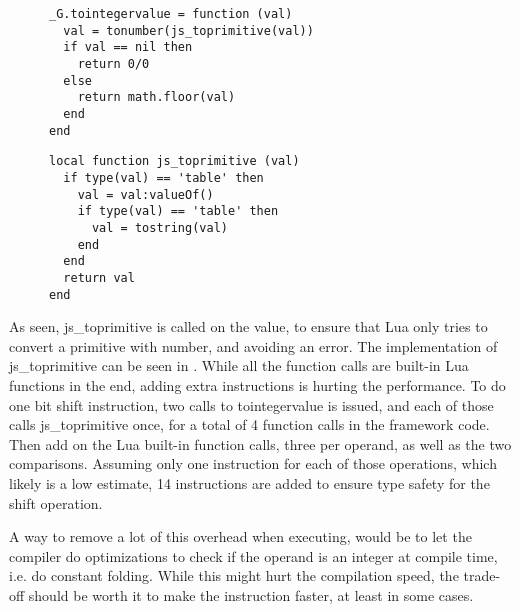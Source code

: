 \begin{figure}[h!]
\begin{minipage}{0.45\textwidth}
\begin{verbatim}
_G.tointegervalue = function (val)
  val = tonumber(js_toprimitive(val))
  if val == nil then
    return 0/0
  else
    return math.floor(val)
  end
end
\end{verbatim}
\label{lst:tessel-lua-tointegervalue}
\end{minipage}\hfill
\begin{minipage}{0.45\textwidth}
\begin{verbatim}
local function js_toprimitive (val)
  if type(val) == 'table' then
    val = val:valueOf()
    if type(val) == 'table' then
      val = tostring(val)
    end
  end
  return val
end
\end{verbatim}
\label{lst:tessel-lua-js-toprimitive}
\end{minipage}
\end{figure}


As seen, js\_toprimitive is called on the value, to ensure that Lua only tries to convert a primitive with number, and avoiding an error.
The implementation of js\_toprimitive can be seen in .
While all the function calls are built-in Lua functions in the end, adding extra instructions is hurting the performance.
To do one bit shift instruction, two calls to tointegervalue is issued, and each of those calls js\_toprimitive once, for a total of 4 function calls in the framework code.
Then add on the Lua built-in function calls, three per operand, as well as the two comparisons.
Assuming only one instruction for each of those operations, which likely is a low estimate, 14 instructions are added to ensure type safety for the shift operation.

A way to remove a lot of this overhead when executing, would be to let the compiler do optimizations to check if the operand is an integer at compile time, i.e. do constant folding.
While this might hurt the compilation speed, the trade-off should be worth it to make the instruction faster, at least in some cases.

